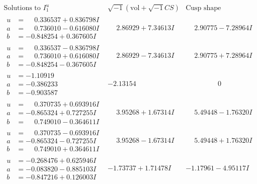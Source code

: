 \documentclass[1p]{elsarticle_modified}
\theoremstyle{definition}
\newcommand{\I}{\sqrt{-1}}
\begin{document}
$$\begin{array}{c|c|c}  
\text{Solutions to }I^u_{1}& \I (\text{vol} + \sqrt{-1}CS) & \text{Cusp shape}\\
 \hline 
\begin{aligned}
u &= \phantom{-}0.336537 + 0.836798 I \\
a &= \phantom{-}0.736010 - 0.616080 I \\
b &= -0.848254 + 0.367605 I\end{aligned}
 & \phantom{-}2.86929 + 7.34613 I & \phantom{-}2.90775 - 7.28964 I \\ \hline\begin{aligned}
u &= \phantom{-}0.336537 - 0.836798 I \\
a &= \phantom{-}0.736010 + 0.616080 I \\
b &= -0.848254 - 0.367605 I\end{aligned}
 & \phantom{-}2.86929 - 7.34613 I & \phantom{-}2.90775 + 7.28964 I \\ \hline\begin{aligned}
u &= -1.10919\phantom{ +0.000000I} \\
a &= -0.386233\phantom{ +0.000000I} \\
b &= -0.903587\phantom{ +0.000000I}\end{aligned}
 & -2.13154\phantom{ +0.000000I} & \phantom{-0.000000 } 0 \\ \hline\begin{aligned}
u &= \phantom{-}0.370735 + 0.693916 I \\
a &= -0.865324 + 0.727255 I \\
b &= \phantom{-}0.749010 - 0.364611 I\end{aligned}
 & \phantom{-}3.95268 + 1.67314 I & \phantom{-}5.49448 - 1.76320 I \\ \hline\begin{aligned}
u &= \phantom{-}0.370735 - 0.693916 I \\
a &= -0.865324 - 0.727255 I \\
b &= \phantom{-}0.749010 + 0.364611 I\end{aligned}
 & \phantom{-}3.95268 - 1.67314 I & \phantom{-}5.49448 + 1.76320 I \\ \hline\begin{aligned}
u &= -0.268476 + 0.625946 I \\
a &= -0.083820 - 0.885103 I \\
b &= -0.847216 + 0.126003 I\end{aligned}
 & -1.73737 + 1.71478 I & -1.17961 - 4.95117 I \\ \hline\begin{aligned}

\end{aligned}
\end{array}$$
\end{document}
